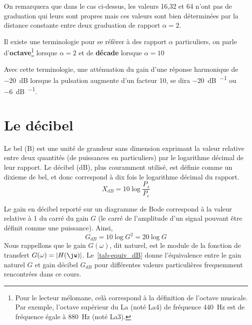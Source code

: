 \begin{center}
    
\end{center}
On remarquera que dans le cas ci-dessus, les valeurs 16,32 et 64 n'ont pas 
de graduation qui leurs sont propres mais ces valeurs sont bien déterminées 
par la distance constante entre deux graduation de rapport $\alpha=2$. 

Il existe une terminologie pour se référer à des rapport $\alpha$ particuliers,
on parle d'\textbf{octave}\footnote{Pour le lecteur mélomane, celà correspond à
la définition de l'octave musicale. Par exemple, l'octave supérieur du 
La (noté La4) de fréquence \SI{440}{\hertz} est de fréquence égale à 
\SI{880}{\hertz} (noté La3).} lorsque $\alpha=2$ et de \textbf{décade} 
lorsque $\alpha=10$

Avec cette terminologie, une atténuation du gain d'une réponse harmonique de 
\SI{-20}{\dB} lorsque la pulsation augmente d'un facteur 10, se dira 
\SI{-20}{\dB\per\dec} ou \SI{-6}{\dB\per\oct}.

\section{Le décibel}
Le bel (B) est une unité de grandeur sans dimension 
exprimant la valeur relative entre deux quantités (de puissances en 
particuliers) par le logarithme décimal de leur rapport. Le décibel (\si{\dB}), 
plus couramment utilisé, est définie comme un dixieme de bel, et donc 
correspond à dix fois le logarithme décimal du rapport.
$$
X_{dB}=10\log{\dfrac{P_s}{P_e}}
$$

Le gain en décibel reporté sur un diagramme de Bode correspond à 
la valeur relative à 1 du carré du gain $G$ (le carré de l'amplitude d'un 
signal pouvant être définit comme une puissance). Ainsi,
$$
G_{dB}=10\log{G^2} = 20\log{G}
$$
Nous rappellons que le gain $G(\omega)$, dit naturel, est le module de la
fonction de transfert $G(\omega)=|H(\jw)|$. Le~\cref{tab-equiv_dB} donne 
l'équivalence entre le gain naturel $G$ et gain décibel $G_{dB}$ pour 
différentes valeurs particulières frequemment rencontrées dans ce cours.

